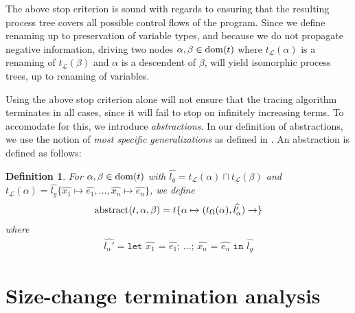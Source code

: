 \documentclass[10pt]{../sigplanconf}
\newcommand{\dom}{\ensuremath{{\rm dom}}}
\newtheorem{definition}{Definition}
\begin{document}
The above stop criterion is sound with regards to ensuring that the
resulting process tree covers all possible control flows of the
program. Since we define renaming up to preservation of variable
types, and because we do not propagate negative information, driving
two nodes $\alpha, \beta \in \dom(t)$ where $t_\mathcal{L}(\alpha)$ is
a renaming of $t_\mathcal{L}(\beta)$ and $\alpha$ is a descendent of
$\beta$, will yield isomorphic process trees, up to renaming of
variables.

Using the above stop criterion alone will not ensure that the tracing
algorithm terminates in all cases, since it will fail to stop on
infinitely increasing terms. To accomodate for this, we introduce
\emph{abstractions}. In our definition of abstractions, we use the
notion of \emph{most specific generalizations} as defined in
\cite{sorensen1998introduction}. An abstraction is defined as follows:
\begin{definition}
  For $\alpha, \beta \in \dom(t)$ with $\widehat{l_g} =
  t_\mathcal{L}(\alpha) \sqcap t_\mathcal{L}(\beta)$ and
  $t_\mathcal{L}(\alpha) = \widehat{l_g} \{ \widehat{x_1} \mapsto
  \widehat{e_1}, ..., \widehat{x_n} \mapsto \widehat{e_n} \}$, we
  define
\begin{align*}
{\rm abstract}(t,\alpha,\beta) = t \{ \alpha \mapsto (t_\Omega(\alpha), \widehat{l_\alpha'})\rightarrow \}
\end{align*}
where
\begin{align*}
\widehat{l_\alpha'} = \texttt{let $\widehat{x_1}$ = $\widehat{e_1}$; $...$; $\widehat{x_n}$ = $\widehat{e_n}$ in $\widehat{l_g}$}
\end{align*}
\end{definition}


\section{Size-change termination analysis}
\end{document}
